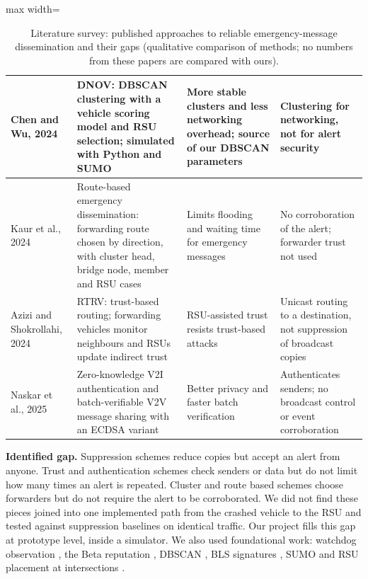 \documentclass[11pt, a4paper]{article}
\begin{document}
\begin{table}[htbp]
\begin{adjustbox}{max width=\textwidth}
\begin{tabular}{|>{\raggedright\arraybackslash}p{2.5cm}|>{\raggedright\arraybackslash}p{4.6cm}|>{\raggedright\arraybackslash}p{3.9cm}|>{\raggedright\arraybackslash}p{4.0cm}|}
\hline
Chen and Wu, 2024 \cite{chen2024dnov} & DNOV: DBSCAN clustering with a vehicle scoring model and RSU selection; simulated with Python and SUMO & More stable clusters and less networking overhead; source of our DBSCAN parameters & Clustering for networking, not for alert security \\
\hline
Kaur et al., 2024 \cite{kaur2024route} & Route-based emergency dissemination: forwarding route chosen by direction, with cluster head, bridge node, member and RSU cases & Limits flooding and waiting time for emergency messages & No corroboration of the alert; forwarder trust not used \\
\hline
Azizi and Shokrollahi, 2024 \cite{azizi2024rtrv} & RTRV: trust-based routing; forwarding vehicles monitor neighbours and RSUs update indirect trust & RSU-assisted trust resists trust-based attacks & Unicast routing to a destination, not suppression of broadcast copies \\
\hline
Naskar et al., 2025 \cite{naskar2025auth} & Zero-knowledge V2I authentication and batch-verifiable V2V message sharing with an ECDSA variant & Better privacy and faster batch verification & Authenticates senders; no broadcast control or event corroboration \\
\hline
\end{tabular}
\end{adjustbox}
\caption{Literature survey: published approaches to reliable emergency-message dissemination and their gaps
(qualitative comparison of methods; no numbers from these papers are compared with ours).}
\label{tab:lit}
\end{table}

\noindent\textbf{Identified gap.} Suppression schemes reduce copies but accept an alert from anyone. Trust and
authentication schemes check senders or data but do not limit how many times an alert is repeated. Cluster and route
based schemes choose forwarders but do not require the alert to be corroborated. We did not find these pieces joined into
one implemented path from the crashed vehicle to the RSU and tested against suppression baselines on identical traffic.
Our project fills this gap at prototype level, inside a simulator. We also used foundational work: watchdog observation
\cite{marti2000watchdog}, the Beta reputation \cite{josang2002beta}, DBSCAN \cite{ester1996dbscan}, BLS signatures
\cite{boneh2004short}, SUMO \cite{lopez2018sumo} and RSU placement at intersections \cite{trullols2010rsu}.

\end{document}
